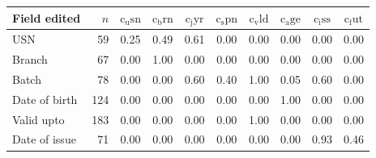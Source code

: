 \begin{tabular}{lrcccccccc}
\toprule
Field edited & $n$ & $\mathrm{c_usn}$ & $\mathrm{c_brn}$ & $\mathrm{c_jyr}$ & $\mathrm{c_spn}$ & $\mathrm{c_vld}$ & $\mathrm{c_age}$ & $\mathrm{c_iss}$ & $\mathrm{c_fut}$\\
\midrule
USN & 59 & 0.25 & 0.49 & 0.61 & 0.00 & 0.00 & 0.00 & 0.00 & 0.00\\
Branch & 67 & 0.00 & 1.00 & 0.00 & 0.00 & 0.00 & 0.00 & 0.00 & 0.00\\
Batch & 78 & 0.00 & 0.00 & 0.60 & 0.40 & 1.00 & 0.05 & 0.60 & 0.00\\
Date of birth & 124 & 0.00 & 0.00 & 0.00 & 0.00 & 0.00 & 1.00 & 0.00 & 0.00\\
Valid upto & 183 & 0.00 & 0.00 & 0.00 & 0.00 & 1.00 & 0.00 & 0.00 & 0.00\\
Date of issue & 71 & 0.00 & 0.00 & 0.00 & 0.00 & 0.00 & 0.00 & 0.93 & 0.46\\
\bottomrule
\end{tabular}
